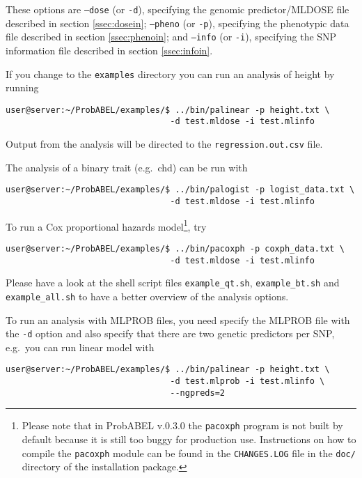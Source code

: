 \documentclass[12pt,a4paper]{article}
\begin{document}
These options are
\texttt{--dose} (or \texttt{-d}),
specifying the genomic predictor/MLDOSE file described in section \ref{ssec:dosein};
\texttt{--pheno} (or \texttt{-p}),
specifying the phenotypic data file described in section \ref{ssec:phenoin}; and
\texttt{--info} (or \texttt{-i}),
specifying the SNP information file described in section \ref{ssec:infoin}.

If you change to the \texttt{examples} directory you can run
an analysis of height by running
\begin{verbatim}
user@server:~/ProbABEL/examples/$ ../bin/palinear -p height.txt \
                                 -d test.mldose -i test.mlinfo
\end{verbatim}
Output from the analysis will be directed to the
\texttt{regression.out.csv} file.

The analysis of a binary trait (e.g.~chd) can be run with
\begin{verbatim}
user@server:~/ProbABEL/examples/$ ../bin/palogist -p logist_data.txt \
                                 -d test.mldose -i test.mlinfo
\end{verbatim}

To run a Cox proportional hazards model\footnote{Please note that in
  ProbABEL v.0.3.0 the \texttt{pacoxph} program is not built by
  default because it is still too buggy for production
  use. Instructions on how to compile the \texttt{pacoxph} module can
  be found in the \texttt{CHANGES.LOG} file in the \texttt{doc/}
  directory of the installation package.}, try
\begin{verbatim}
user@server:~/ProbABEL/examples/$ ../bin/pacoxph -p coxph_data.txt \
                                 -d test.mldose -i test.mlinfo
\end{verbatim}

Please have a look at the shell script files \texttt{example\_qt.sh},
\texttt{example\_bt.sh} and \texttt{example\_all.sh} to have
a better overview of the analysis options.

To run an analysis with MLPROB files, you need specify the MLPROB file
with the \texttt{-d} option and also specify that there are two
genetic predictors per SNP, e.g.~you can run linear model with
\begin{verbatim}
user@server:~/ProbABEL/examples/$ ../bin/palinear -p height.txt \
                                 -d test.mlprob -i test.mlinfo \
                                 --ngpreds=2
\end{verbatim}
\end{document}
